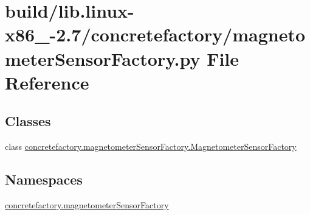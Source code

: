 \hypertarget{build_2lib_8linux-x86__64-2_87_2concretefactory_2magnetometerSensorFactory_8py}{}\section{build/lib.linux-\/x86\+\_-\/2.7/concretefactory/magnetometer\+Sensor\+Factory.py File Reference}
\label{build_2lib_8linux-x86__64-2_87_2concretefactory_2magnetometerSensorFactory_8py}
\subsection*{Classes}
\begin{DoxyCompactItemize}
\item 
class \hyperlink{classconcretefactory_1_1magnetometerSensorFactory_1_1MagnetometerSensorFactory}{concretefactory.\+magnetometer\+Sensor\+Factory.\+Magnetometer\+Sensor\+Factory}
\end{DoxyCompactItemize}
\subsection*{Namespaces}
\begin{DoxyCompactItemize}
\item 
 \hyperlink{namespaceconcretefactory_1_1magnetometerSensorFactory}{concretefactory.\+magnetometer\+Sensor\+Factory}
\end{DoxyCompactItemize}
